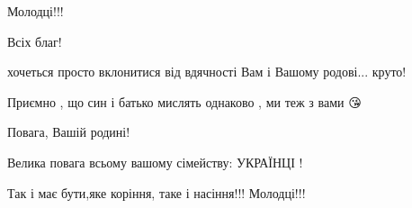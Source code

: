 \begin{itemize}
Молодці!!!

 
Всіх благ!

 
хочеться просто вклонитися від вдячності Вам і Вашому родові... круто!

 
Приємно , що син і батько мислять однаково , ми теж з вами 😘


 
Повага, Вашій родині!

 
Велика повага всьому вашому сімейству: УКРАЇНЦІ !

 
Так і має бути,яке коріння, таке і насіння!!! Молодці!!!

 


\end{itemize}
